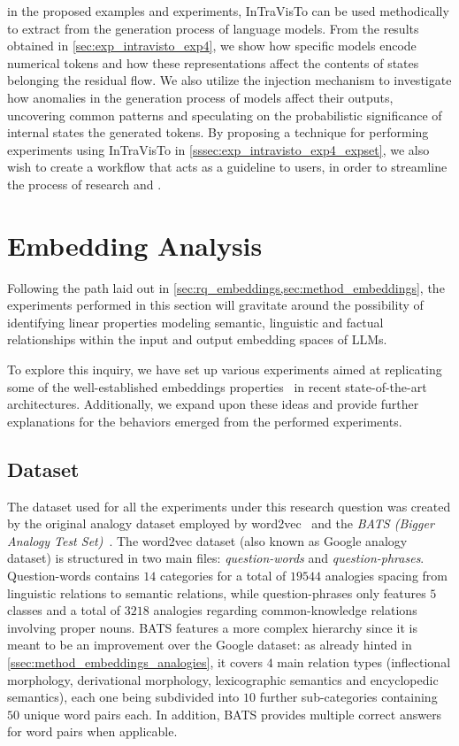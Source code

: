  in the proposed examples and experiments, InTraVisTo can be used methodically to extract  from the generation process of language models.
From the results obtained in \cref{sec:exp_intravisto_exp4}, we show how specific models encode numerical tokens and how these representations affect the contents of states belonging the residual flow.
We also utilize the injection mechanism to investigate how anomalies in the generation process of models affect their outputs, uncovering common patterns and speculating on the probabilistic significance of internal states  the generated tokens. 
By proposing a technique for performing experiments using InTraVisTo in \cref{sssec:exp_intravisto_exp4_expset}, we also wish to create a workflow that acts as a guideline to users, in order to streamline the process of research and .

\section{Embedding Analysis}\label{sec:exp_emb}

Following the path laid out in \cref{sec:rq_embeddings,sec:method_embeddings}, the experiments performed in this section will gravitate around the possibility of identifying linear properties modeling semantic, linguistic and factual relationships within the input and output embedding spaces of LLMs.

To explore this inquiry, we have set up various experiments aimed at replicating some of the well-established embeddings properties~\cite{mikolov2013} in recent state-of-the-art architectures.
Additionally, we expand upon these ideas and provide further explanations for the behaviors emerged from the performed experiments.

\subsection{Dataset}

The dataset used for all the experiments under this research question was created by  the original analogy dataset employed by word2vec~\cite{mikolov2013} and the \emph{BATS (Bigger Analogy Test Set)}~\cite{drozd2016}.
The word2vec dataset (also known as Google analogy dataset) is structured in two main files: \emph{question-words} and \emph{question-phrases}.
Question-words contains $14$ categories for a total of $19544$ analogies spacing from linguistic relations to semantic relations, while question-phrases only features $5$ classes and a total of $3218$ analogies regarding common-knowledge relations involving proper nouns.
BATS features a more complex hierarchy since it is meant to be an improvement over the Google dataset: as already hinted in \cref{ssec:method_embeddings_analogies}, it covers $4$ main relation types (inflectional morphology, derivational morphology, lexicographic semantics and encyclopedic semantics), each one being subdivided into $10$ further sub-categories containing $50$ unique word pairs each.
In addition, BATS provides multiple correct answers for word pairs when applicable. 

